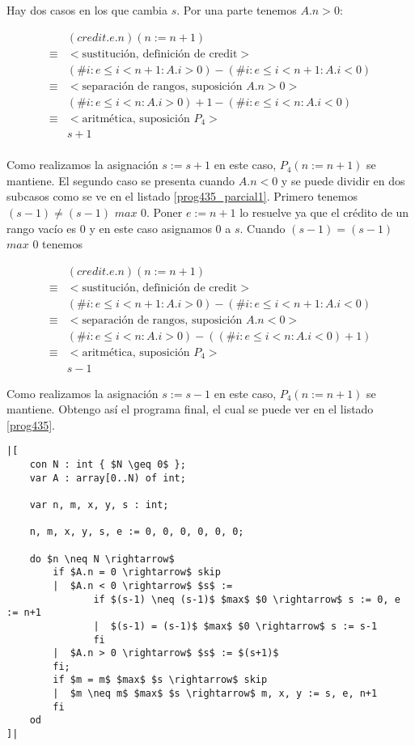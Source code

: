 \documentclass{article}
\begin{document}
Hay dos casos en los que cambia $s$. Por una parte tenemos $A.n > 0$:

\begin{align*}
 & (credit.e.n)(n := n+1) \\
 \equiv & <\text{sustitución, definición de credit}> \\
 & (\# i : e \leq i < n+1 : A.i > 0) - (\# i : e \leq i < n+1 : A.i < 0) \\
 \equiv & <\text{separación de rangos, suposición } A.n > 0> \\
 & (\# i : e \leq i < n : A.i > 0) + 1 - (\# i : e \leq i < n : A.i < 0) \\
 \equiv & <\text{aritmética, suposición } P_4> \\
 & s + 1 \\
\end{align*}

Como realizamos la asignación $s := s + 1$ en este caso, $P_4(n := n+1)$ se mantiene.
El segundo caso se presenta cuando $A.n < 0$ y se puede dividir en dos subcasos como se
ve en el listado \ref{prog435_parcial1}. Primero tenemos $(s - 1) \neq (s - 1)$ $max$ $0$.
Poner $e := n+1$ lo resuelve ya que el crédito de un rango vacío es $0$ y en este caso
asignamos $0$ a $s$. Cuando $(s - 1) = (s - 1)$ $max$ $0$ tenemos

\begin{align*}
 & (credit.e.n)(n := n+1) \\
 \equiv & <\text{sustitución, definición de credit}> \\
 & (\# i : e \leq i < n+1 : A.i > 0) - (\# i : e \leq i < n+1 : A.i < 0) \\
 \equiv & <\text{separación de rangos, suposición } A.n < 0> \\
 & (\# i : e \leq i < n : A.i > 0) - ((\# i : e \leq i < n : A.i < 0) + 1) \\
 \equiv & <\text{aritmética, suposición } P_4> \\
 & s - 1
\end{align*}

Como realizamos la asignación $s := s - 1$ en este caso, $P_4(n := n+1)$ se mantiene. Obtengo
así el programa final, el cual se puede ver en el listado \ref{prog435}.

\begin{lstlisting}[float,caption={Solución del ejercicio 4.3.5},label=prog435]
|[
    con N : int { $N \geq 0$ };
    var A : array[0..N) of int;

    var n, m, x, y, s : int;

    n, m, x, y, s, e := 0, 0, 0, 0, 0, 0;

    do $n \neq N \rightarrow$
        if $A.n = 0 \rightarrow$ skip
        |  $A.n < 0 \rightarrow$ $s$ :=
               if $(s-1) \neq (s-1)$ $max$ $0 \rightarrow$ s := 0, e := n+1
               |  $(s-1) = (s-1)$ $max$ $0 \rightarrow$ s := s-1
               fi
        |  $A.n > 0 \rightarrow$ $s$ := $(s+1)$
        fi;
        if $m = m$ $max$ $s \rightarrow$ skip
        |  $m \neq m$ $max$ $s \rightarrow$ m, x, y := s, e, n+1
        fi
    od
]|
\end{lstlisting}
\end{document}
